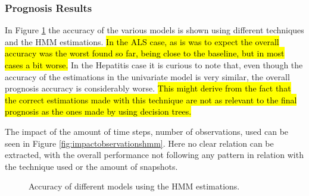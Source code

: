 \subsubsection{Prognosis Results}
\label{subsubsection:prognosis_hmm}

In Figure \ref{fig:accuracyhmm} the accuracy of the various models is shown using different techniques and the HMM estimations.\hl{ In the ALS case, as is was to expect the overall accuracy was the worst found so far, being close to the baseline, but in most cases a bit worse.} In the Hepatitis case it is curious to note that, even though the accuracy of the estimations in the univariate model is very similar, the overall prognosis accuracy is considerably worse. \hl{This might derive from the fact that the correct estimations made with this technique are not as relevant to the final prognosis as the ones made by using decision trees.}

The impact of the amount of time steps, number of observations, used can be seen in Figure \ref{fig:impactobservationshmm}. Here no clear relation can be extracted, with the overall performance not following any pattern in relation with the technique used or the amount of snapshots. 

 \begin{figure}[h]
 	\begin{subfigmatrix}{2}
 	\end{subfigmatrix}
 	\caption{Accuracy of different models using the HMM estimations.}
 	\label{fig:accuracyhmm}
 \end{figure}
 
